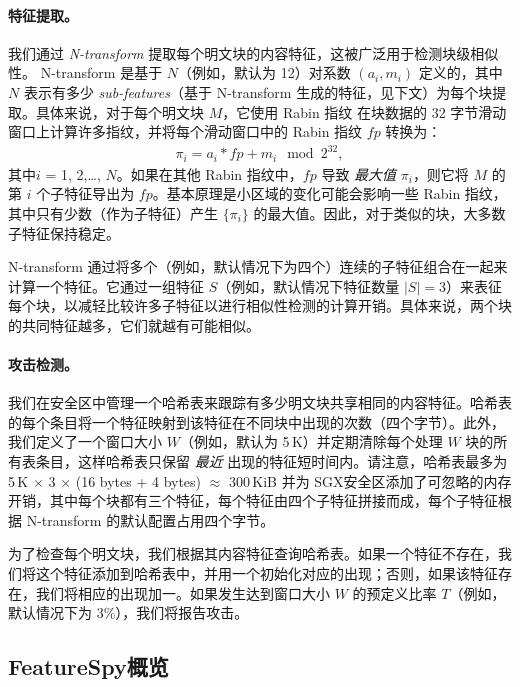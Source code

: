 \paragraph*{特征提取。}
我们通过 {\em N-transform} \cite{shilane12} 提取每个明文块的内容特征，这被广泛用于检测块级相似性。 N-transform 是基于 $N$（例如，默认为 12）对系数 $(a_i, m_i)$ 定义的，其中 $N$ 表示有多少 {\em sub-features}（基于 N-transform 生成的特征，见下文）为每个块提取。具体来说，对于每个明文块 $M$，它使用 Rabin 指纹 \cite{rabin81} 在块数据的 32 字节滑动窗口上计算许多指纹，并将每个滑动窗口中的 Rabin 指纹 $fp$ 转换为：
\begin{eqnarray}
  \label{eq:featurespy-feature}
  \pi_i = a_i * fp + m_i \mod 2^{32},
\end{eqnarray}
其中$i$ = 1, 2,\ldots, $N$。如果在其他 Rabin 指纹中，$fp$ 导致 {\em 最大值} $\pi_i$，则它将 $M$ 的第 $i$ 个子特征导出为 $fp$。基本原理是小区域的变化可能会影响一些 Rabin 指纹，其中只有少数（作为子特征）产生 $\{\pi_i\}$ 的最大值。因此，对于类似的块，大多数子特征保持稳定。

N-transform 通过将多个（例如，默认情况下为四个）连续的子特征组合在一起来计算一个特征。它通过一组特征 $S$（例如，默认情况下特征数量 $|S| = 3$）来表征每个块，以减轻比较许多子特征以进行相似性检测的计算开销。具体来说，两个块的共同特征越多，它们就越有可能相似。


\paragraph*{攻击检测。}
我们在安全区中管理一个哈希表来跟踪有多少明文块共享相同的内容特征。哈希表的每个条目将一个特征映射到该特征在不同块中出现的次数（四个字节）。此外，我们定义了一个窗口大小 $W$（例如，默认为 5\,K）并定期清除每个处理 $W$ 块的所有表条目，这样哈希表只保留 {\em 最近} 出现的特征短时间内。请注意，哈希表最多为 5\,K $\times$ 3 $\times$ (16 bytes + 4 bytes) $\approx$ 300\,KiB 并为 SGX安全区添加了可忽略的内存开销，其中每个块都有三个特征，每个特征由四个子特征拼接而成，每个子特征根据 N-transform 的默认配置占用四个字节。

为了检查每个明文块，我们根据其内容特征查询哈希表。如果一个特征不存在，我们将这个特征添加到哈希表中，并用一个初始化对应的出现；否则，如果该特征存在，我们将相应的出现加一。如果发生达到窗口大小 $W$ 的预定义比率 $T$（例如，默认情况下为 3\%），我们将报告攻击。



\subsection{FeatureSpy概览}
\label{subsec:featurespy-secure_design}

